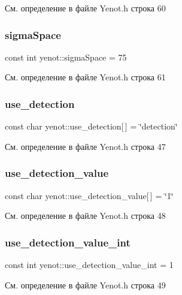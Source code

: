 См. определение в файле Yenot.\+h строка 60

\mbox{\label{namespaceyenot_adbbb6d50f7db1942c60be8b5d621d3b7}} 
\subsubsection{\texorpdfstring{sigma\+Space}{sigmaSpace}}
{\footnotesize\ttfamily const int yenot\+::sigma\+Space = 75}



См. определение в файле Yenot.\+h строка 61

\mbox{\label{namespaceyenot_a17fec4b53b47f434f720ad8e804e3497}} 
\subsubsection{\texorpdfstring{use\+\_\+detection}{use\_detection}}
{\footnotesize\ttfamily const char yenot\+::use\+\_\+detection\mbox{[}$\,$\mbox{]} = \char`\"{}detection\char`\"{}}



См. определение в файле Yenot.\+h строка 47

\mbox{\label{namespaceyenot_affbdf7e1315bdd3e0c9f7bb5d1b0a9b1}} 
\subsubsection{\texorpdfstring{use\+\_\+detection\+\_\+value}{use\_detection\_value}}
{\footnotesize\ttfamily const char yenot\+::use\+\_\+detection\+\_\+value\mbox{[}$\,$\mbox{]} = \char`\"{}1\char`\"{}}



См. определение в файле Yenot.\+h строка 48

\mbox{\label{namespaceyenot_a8ba9c1f83b4502a37417a016875a3918}} 
\subsubsection{\texorpdfstring{use\+\_\+detection\+\_\+value\+\_\+int}{use\_detection\_value\_int}}
{\footnotesize\ttfamily const int yenot\+::use\+\_\+detection\+\_\+value\+\_\+int = 1}



См. определение в файле Yenot.\+h строка 49

